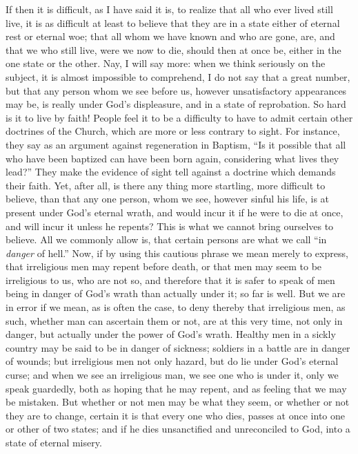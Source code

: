 If then it is difficult, as I have said it is, to realize that all
who ever lived still live, it is as difficult at least to believe that
they are in a state either of eternal rest or eternal woe; that all
whom we have known and who are gone, are, and that we who still live,
were we now to die, should then at once be, either in the one state or
the other. Nay, I will say more: when we think seriously on the
subject, it is almost impossible to comprehend, I do not say that a
great number, but that any person whom we see before us, however
unsatisfactory appearances may be, is really under God's displeasure,
and in a state of reprobation. So hard is it to live by faith! People
feel it to be a difficulty to have to admit certain other doctrines of
the Church, which are more or less contrary to sight. For instance,
they say as an argument against regeneration in Baptism, ``Is it
possible that all who have been baptized can have been born again,
considering what lives they lead?'' They make the evidence of
sight tell against a doctrine which demands their faith. Yet, after
all, is there any thing more startling, more difficult to believe,
than that any one person, whom we see, however sinful his life, is at
present under God's eternal wrath, and would incur it if he were to
die at once, and will incur it unless he repents? This is what we
cannot bring ourselves to believe. All we commonly allow is, that
certain persons are what we call ``in \emph{danger} of hell.''
Now, if by using this cautious phrase we mean merely to express, that
irreligious men may repent before death, or that men may seem to be
irreligious to us, who are not so, and therefore that it is safer to
speak of men being in danger of God's wrath than actually under it; so
far is well. But we are in error if we mean, as is often the case, to
deny thereby that irreligious men, as such, whether man can ascertain
them or not, are at this very time, not only in danger, but actually
under the power of God's wrath. Healthy men in a sickly country may be
said to be in danger of sickness; soldiers in a battle are in danger
of wounds; but irreligious men not only hazard, but do lie under God's
eternal curse; and when we see an irreligious man, we see one who is
under it, only we speak guardedly, both as hoping that he may repent,
and as feeling that we may be mistaken. But whether or not men may be
what they seem, or whether or not they are to change, certain it is
that every one who dies, passes at once into one or other of two
states; and if he dies unsanctified and unreconciled to God, into a
state of eternal misery.

